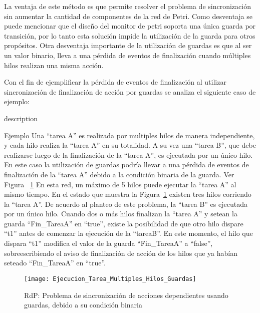 La ventaja de este método es que permite resolver el problema de sincronización
sin aumentar la cantidad de componentes de la red de Petri.
Como desventaja se puede mencionar que el diseño
del monitor de petri soporta una única guarda por transición, por lo tanto esta
solución impide la utilización de la guarda para otros propósitos. Otra
desventaja importante de la utilización de guardas es que al ser un valor
binario, lleva a una pérdida de eventos de finalización cuando
múltiples hilos realizan una misma acción.

Con el fin de ejemplificar la pérdida de eventos de finalización al utilizar
sincronización de finalización de acción por guardas se analiza el siguiente
caso de ejemplo:
\begin{labeling}{description}
\item [Ejemplo]
	Una ``tarea A'' es realizada por multiples hilos de manera independiente, y cada
	hilo realiza la ``tarea A'' en su totalidad. A su vez una ``tarea B'', que
	debe realizarse luego de la finalización de la ``tarea A'', es ejecutada por
	un único hilo. En este caso la utilización de guardas podría llevar a una
	pérdida de eventos de finalización de la ``tarea A'' debido a la condición
	binaria de la guarda. Ver Figura ~\ref{fig:ejecucion_multiples_hilos_guardas}
	En esta red, un máximo de 5 hilos puede ejecutar la ``tarea A'' al mismo
	tiempo. En el estado que  muestra la
	Figura~\ref{fig:ejecucion_multiples_hilos_guardas} existen tres hilos
	corriendo la ``tarea A''. De acuerdo al planteo de este problema, la ``tarea
	B'' es ejecutada por un único hilo. Cuando dos o más hilos finalizan la ``tarea
	A'' y setean la guarda ``Fin\_TareaA'' en ``true'', existe la posibilidad de
	que otro hilo dispare ``t1'' antes de comenzar la ejecución de
	la ``tareaB''. En este momento, el hilo que dispara ``t1'' modifica el
	valor de la guarda ``Fin\_TareaA'' a ``false'', sobreescribiendo el aviso de
	finalización de acción de los hilos que ya habían seteado ``Fin\_TareaA'' en
	``true''.
\end{labeling}

\begin{figure}[H]
    \centering
    \texttt{[image: Ejecucion\_Tarea\_Multiples\_Hilos\_Guardas]}
    \caption{RdP: Problema de sincronización de acciones dependientes usando
    guardas, debido a su condición binaria}
    \label{fig:ejecucion_multiples_hilos_guardas}
\end{figure}


